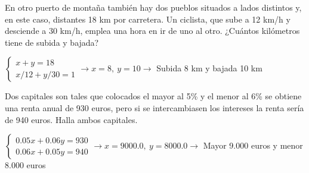 \documentclass[spanish, 12pt]{exam}
\begin{document}
\begin{questions}
\question En otro puerto de montaña también hay dos pueblos situados a lados distintos y, en este caso, distantes 18 km por carretera. Un ciclista, que sube a 12 km/h y desciende a 30 km/h, emplea una hora en ir de uno al otro. ¿Cuántos kilómetros tiene de subida y bajada?

\begin{solution} $\left\{\begin{matrix}x+y=18 \\ x/12+y/30=1\end{matrix}\right. \to  x = 8, \  y = 10 \to $ Subida 8 km y bajada 10 km \end{solution}

\question Dos capitales son tales que colocados el mayor al 5\% y el menor al 6\% se obtiene una renta anual de 930 euros, pero si se intercambiasen los intereses la renta sería de 940 euros. Halla ambos capitales.
\begin{solution} $\left\{\begin{matrix}0.05x+0.06y=930 \\ 0.06x+0.05y=940\end{matrix}\right. \to  x = 9000.0, \  y = 8000.0 \to $ Mayor 9.000 euros y menor 8.000 euros \end{solution}

\end{questions}
\end{document}
